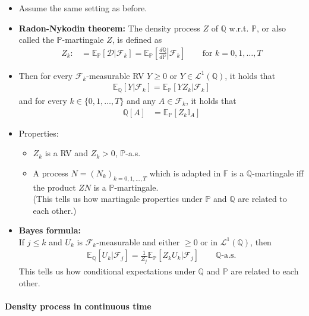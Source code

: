 \documentclass[a4paper,landscape,8pt,fleqn]{scrartcl}
\renewcommand{\emph}[1]{\textbf{#1}}
\begin{document}
\begin{multicols*}{3}
\begin{itemize}
\item Assume the same setting as before.
\item \emph{Radon-Nykodin theorem:} The density process $Z$ of $\mathbb{Q}$ w.r.t. $\mathbb{P}$, or also called the $\mathbb{P}$-martingale $Z$, is defined as
\begin{align*}
Z_k :&= \mathbb{E}_\mathbb{P}[\mathcal{D}| \mathcal{F}_k] = \mathbb{E}_\mathbb{P} \left[ \left. \frac{d\mathbb{Q}}{d\mathbb{P}} \right\vert \mathcal{F}_k \right] \qquad \text{for } k=0,1, \ldots, T
\end{align*}
\item Then for every $\mathcal{F}_k$-measurable RV $Y \geq 0$ or $Y \in \mathcal{L}^1(\mathbb{Q})$, it holds that
\begin{align*}
\mathbb{E}_\mathbb{Q}[Y | \mathcal{F}_k] = \mathbb{E}_\mathbb{P}[Y Z_k | \mathcal{F}_k]
\end{align*}
and for every $k \in \lbrace 0,1,\ldots, T \rbrace$ and any $A \in \mathcal{F}_k$, it holds that
\begin{align*}
\mathbb{Q}[A] &= \mathbb{E}_\mathbb{P}[Z_k \mathbb{I}_A]
\end{align*}
\item Properties:
\begin{itemize}
\item $Z_k$ is a RV and $Z_k > 0$, $\mathbb{P}$-a.s.
\item A process $N = (N_k)_{k=0,1, \ldots, T}$ which is adapted in $\mathbb{F}$ is a $\mathbb{Q}$-martingale iff the product $Z N$ is a $\mathbb{P}$-martingale. \\
(This tells us how martingale properties under $\mathbb{P}$ and $\mathbb{Q}$ are related to each other.)
\end{itemize}
\item \emph{Bayes formula:} \\
If $j \leq k$ and $U_k$ is $\mathcal{F}_k$-measurable and either $\geq 0$ or in $\mathcal{L}^1(\mathbb{Q})$, then
\begin{align*}
\mathbb{E}_\mathbb{Q} [U_k | \mathcal{F}_j] = \frac{1}{Z_j} \mathbb{E}_\mathbb{P}[Z_k U_k | \mathcal{F}_j] \qquad \mathbb{Q} \text{-a.s.}
\end{align*}
This tells us how conditional expectations under $\mathbb{Q}$ and $\mathbb{P}$ are related to each other.
\end{itemize}

\paragraph{Density process in continuous time}


\end{multicols*}
\end{document}
